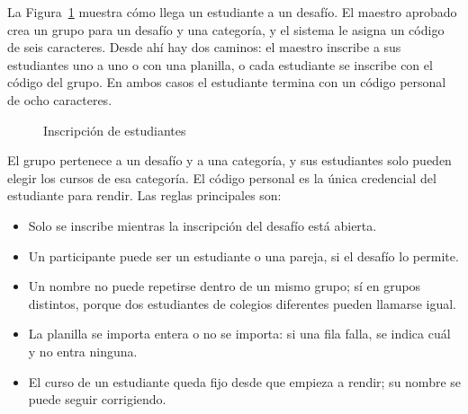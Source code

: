La Figura~\ref{fig:flujo_inscripcion} muestra cómo llega un estudiante a un desafío. El maestro aprobado crea un grupo para un desafío y una categoría, y el sistema le asigna un código de seis caracteres. Desde ahí hay dos caminos: el maestro inscribe a sus estudiantes uno a uno o con una planilla, o cada estudiante se inscribe con el código del grupo. En ambos casos el estudiante termina con un código personal de ocho caracteres.

\begin{figure}[H]
\centering
{}
\caption{Inscripción de estudiantes}
\label{fig:flujo_inscripcion}
\end{figure}

El grupo pertenece a un desafío y a una categoría, y sus estudiantes solo pueden elegir los cursos de esa categoría. El código personal es la única credencial del estudiante para rendir. Las reglas principales son:

\begin{itemize}
    \item Solo se inscribe mientras la inscripción del desafío está abierta.
    \item Un participante puede ser un estudiante o una pareja, si el desafío lo permite.
    \item Un nombre no puede repetirse dentro de un mismo grupo; sí en grupos distintos, porque dos estudiantes de colegios diferentes pueden llamarse igual.
    \item La planilla se importa entera o no se importa: si una fila falla, se indica cuál y no entra ninguna.
    \item El curso de un estudiante queda fijo desde que empieza a rendir; su nombre se puede seguir corrigiendo.
\end{itemize}

